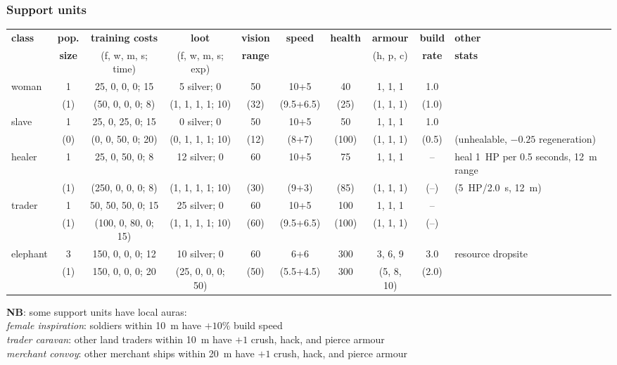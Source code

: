 \documentclass{article}
\begin{document}
\begin{landscape}
\subsubsection{Support units}
\begin{tabular}{l|ccc|cccc|c|l}
{\bf class} & {\bf pop.} & {\bf training costs} & {\bf loot}          & {\bf vision} & {\bf speed} & {\bf health} & {\bf armour} & {\bf build} & {\bf other} \\
            & {\bf size} & {(f, w, m, s; time)} & {(f, w, m, s; exp)} & {\bf range } &             &              & {(h, p, c)}  & {\bf rate } & {\bf stats} \\
\hline
woman   &  1  &   25,   0,   0, 0; 15  &       5 silver;  0  &  50  &   10+5    &   40  &  1, 1, 1   &  1.0  & \\
         & (1) &  (50,   0,   0, 0;  8) &  (1,  1,  1, 1; 10) & (32) & (9.5+6.5) &  (25) & (1, 1, 1)  & (1.0) & \\
\hline
slave    &  1  &   25,   0,  25, 0; 15  &       0 silver;  0  &  50  &   10+5    &   50  &  1, 1, 1   &  1.0  & \\
         & (0) &   (0,   0,  50, 0; 20) &  (0,  1,  1, 1; 10) & (12) &   (8+7)   & (100) & (1, 1, 1)  & (0.5) & (unhealable, $-0.25$ regeneration) \\
\hline
healer   &  1  &   25,   0,  50, 0;  8  &      12 silver;  0  &  60  &   10+5    &   75  &  1, 1, 1   &   --  & heal 1~HP per 0.5 seconds, 12~m range \\
         & (1) & (250,   0,   0, 0;  8) &  (1,  1,  1, 1; 10) & (30) &   (9+3)   &  (85) & (1, 1, 1)  &  (--) & (5~HP/2.0~s, 12~m) \\
\hline
trader   &  1  &   50,  50,  50, 0; 15  &      25 silver;  0  &  60  &   10+5    &  100  &  1, 1, 1   &   --  & \\
         & (1) & (100,   0,  80, 0; 15) &  (1,  1,  1, 1; 10) & (60) & (9.5+6.5) & (100) & (1, 1, 1)  &  (--) & \\
\hline
elephant &  3  &  150,   0,   0, 0; 12  &      10 silver;  0  &  60  &    6+6    &  300  &  3, 6, 9   &  3.0  & resource dropsite \\
         & (1) &  150,   0,   0, 0; 20  & (25,  0,  0, 0; 50) & (50) & (5.5+4.5) &  300  & (5, 8, 10) & (2.0) & \\
\end{tabular}

\textbf{NB}: some support units have local auras:\\
\emph{female inspiration}: soldiers within 10~m have $+10\%$ build speed\\
\emph{trader caravan}: other land traders within 10~m have $+1$ crush, hack, and pierce armour\\
\emph{merchant convoy}: other merchant ships within 20~m have $+1$ crush, hack, and pierce armour
\end{landscape}
\end{document}
